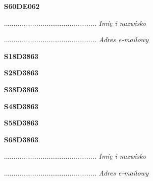 \begin{turn}{90}\huge \textbf{S60DE062}\end{turn}

\begin{turn}{90}\begin{minipage}{\linewidth} \vspace{20mm} ................................................  \textit{Imię i nazwisko}\end{minipage}\end{turn}

\begin{turn}{90}\begin{minipage}{\linewidth} \vspace{20mm} ................................................  \textit{Adres e-mailowy}\end{minipage}\end{turn}

\begin{turn}{90}\huge \textbf{S18D3863}\end{turn}

\begin{turn}{90}\huge \textbf{S28D3863}\end{turn}

\begin{turn}{90}\huge \textbf{S38D3863}\end{turn}

\begin{turn}{90}\huge \textbf{S48D3863}\end{turn}

\begin{turn}{90}\huge \textbf{S58D3863}\end{turn}

\begin{turn}{90}\huge \textbf{S68D3863}\end{turn}

\begin{turn}{90}\begin{minipage}{\linewidth} \vspace{20mm} ................................................  \textit{Imię i nazwisko}\end{minipage}\end{turn}

\begin{turn}{90}\begin{minipage}{\linewidth} \vspace{20mm} ................................................  \textit{Adres e-mailowy}\end{minipage}\end{turn}

